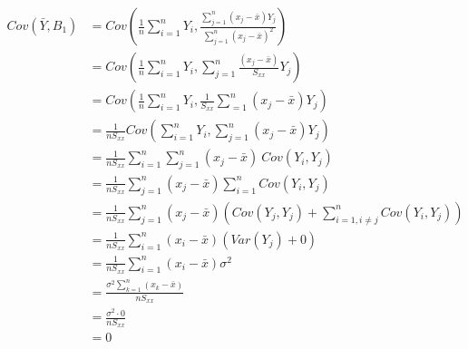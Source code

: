 \documentclass{article}
\begin{document}
\begin{align*}
    Cov(\bar{Y}, B_1) & = Cov\left( \frac{1}{n} \sum_{i=1}^n Y_i, \frac{\sum_{j=1}^n (x_j - \bar{x}) Y_j}{\sum_{j=1}^n (x_j - \bar{x})^2} \right) \\
                      & = Cov\left( \frac{1}{n} \sum_{i=1}^n Y_i, \sum_{j=1}^n \frac{(x_j - \bar{x})}{S_{xx}} Y_j \right)                         \\
                      & = Cov\left( \frac{1}{n} \sum_{i=1}^n Y_i, \frac{1}{S_{xx}} \sum_{=1}^n (x_j - \bar{x}) Y_j \right)                        \\
                      & = \frac{1}{n S_{xx}} Cov\left( \sum_{i=1}^n Y_i, \sum_{j=1}^n (x_j - \bar{x}) Y_j \right)                                 \\
                      & = \frac{1}{n S_{xx}} \sum_{i=1}^n \sum_{j=1}^n (x_j - \bar{x}) \:Cov(Y_i, Y_j)                                            \\
                      & = \frac{1}{n S_{xx}} \sum_{j=1}^n (x_j - \bar{x}) \sum_{i=1}^n Cov(Y_i, Y_j)                                              \\
                      & = \frac{1}{n S_{xx}} \sum_{j=1}^n (x_j - \bar{x}) \left( Cov(Y_j, Y_j) + \sum_{i=1, i\neq j}^n Cov(Y_i, Y_j) \right)      \\
                      & = \frac{1}{n S_{xx}} \sum_{i=1}^n (x_i - \bar{x}) (Var(Y_j) + 0)                                                          \\
                      & = \frac{1}{n S_{xx}} \sum_{i=1}^n (x_i - \bar{x}) \sigma^2                                                                \\
                      & = \frac{\sigma^2 \sum_{k=1}^n (x_k - \bar{x})}{n S_{xx}}                                                                  \\
                      & = \frac{\sigma^2 \cdot 0}{n S_{xx}}                                                                                       \\
                      & = 0
\end{align*}
\end{document}
